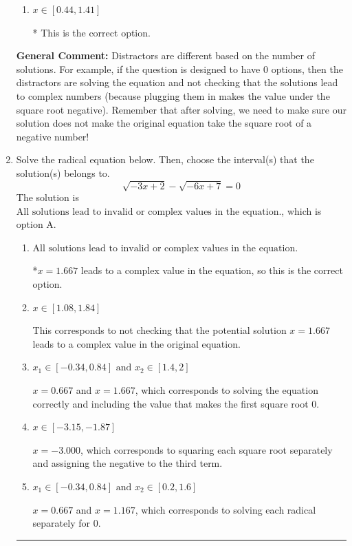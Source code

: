 \documentclass{extbook}[14pt]
\newcommand{\litem}[1]{\item #1

\rule{\textwidth}{0.4pt}}
\begin{document}
\begin{enumerate}
{\begin{enumerate}[label=\Alph*.]
$x = 0.750 \text{ and } x = 1.167$, which corresponds to negatives or the absolute value of the values you would have gotten by solving the equation correctly.
\item \( x \in [0.44,1.41] \)

* This is the correct option.
\end{enumerate}

\textbf{General Comment:} Distractors are different based on the number of solutions. For example, if the question is designed to have 0 options, then the distractors are solving the equation and not checking that the solutions lead to complex numbers (because plugging them in makes the value under the square root negative). Remember that after solving, we need to make sure our solution does not make the original equation take the square root of a negative number!
}
\litem{
Solve the radical equation below. Then, choose the interval(s) that the solution(s) belongs to.
\[ \sqrt{-3 x + 2} - \sqrt{-6 x + 7} = 0 \]The solution is \( \text{All solutions lead to invalid or complex values in the equation.} \), which is option A.\begin{enumerate}[label=\Alph*.]
\item \( \text{All solutions lead to invalid or complex values in the equation.} \)

*$x = 1.667$ leads to a complex value in the equation, so this is the correct option.
\item \( x \in [1.08,1.84] \)

This corresponds to not checking that the potential solution $x = 1.667$ leads to a complex value in the original equation.
\item \( x_1 \in [-0.34, 0.84] \text{ and } x_2 \in [1.4,2] \)

$x = 0.667$ and $x = 1.667$, which corresponds to solving the equation correctly and including the value that makes the first square root 0.
\item \( x \in [-3.15,-1.87] \)

$x = -3.000$, which corresponds to squaring each square root separately and assigning the negative to the third term.
\item \( x_1 \in [-0.34, 0.84] \text{ and } x_2 \in [0.2,1.6] \)

$x = 0.667$ and $x = 1.167$, which corresponds to solving each radical separately for 0.
\end{enumerate}

}
\end{enumerate}
\end{document}
